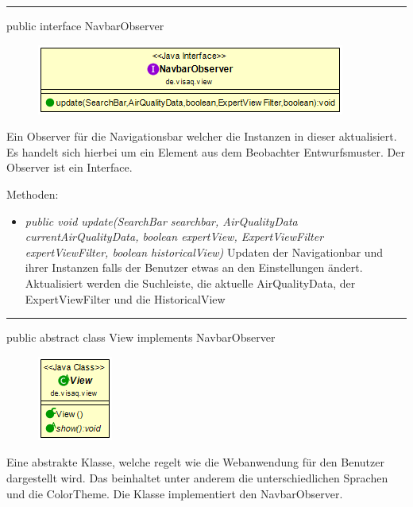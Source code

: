 \rule{\textwidth}{0.4pt}
public interface NavbarObserver

\begin{minipage}{0.4\textwidth}
    \begin{figure}[H]
        \includegraphics[scale = 0.5]{media/frontend/view/de.view/NavbarObserver_Class.png}
    \end{figure}
\end{minipage} \hfill
\begin{minipage}{0.5\textwidth}
    Ein Observer für die Navigationsbar welcher die Instanzen in dieser aktualisiert. Es handelt sich hierbei um ein Element aus dem Beobachter Entwurfsmuster. Der Observer ist ein Interface.
\end{minipage}

Methoden:
\begin{itemize} 
    \item \emph{public void update(SearchBar searchbar, AirQualityData currentAirQualityData,
    boolean expertView, ExpertViewFilter expertViewFilter, boolean historicalView)} Updaten der Navigationbar und ihrer Instanzen falls der Benutzer etwas an den Einstellungen ändert. Aktualisiert werden die Suchleiste, die aktuelle AirQualityData, der ExpertViewFilter und die HistoricalView
\end{itemize}

\rule{\textwidth}{0.4pt}
public abstract class View implements NavbarObserver

\begin{minipage}{0.3\textwidth}
    \begin{figure}[H]
        \includegraphics[scale = 0.7]{media/frontend/view/de.view/View_Class.png}
    \end{figure}
\end{minipage} \hfill
\begin{minipage}{0.7\textwidth}
    Eine abstrakte Klasse, welche regelt wie die Webanwendung für den Benutzer dargestellt wird. Das beinhaltet unter anderem die unterschiedlichen Sprachen und die ColorTheme. Die Klasse implementiert den NavbarObserver.
\end{minipage}

